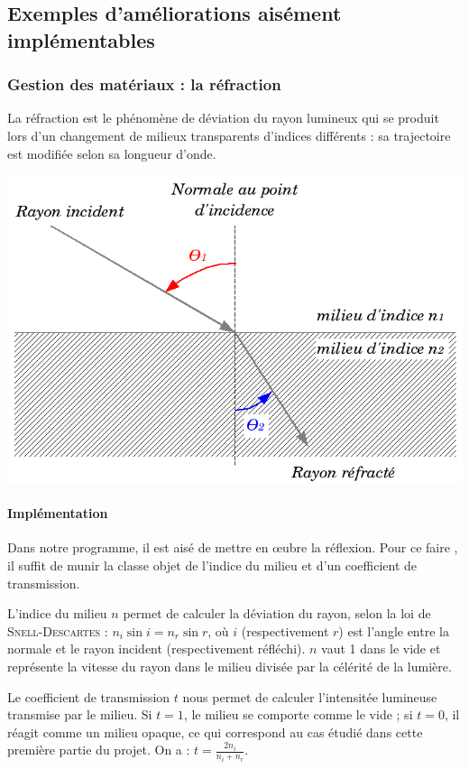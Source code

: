\documentclass{article}
\begin{document}
\subsection{Exemples d'améliorations aisément implémentables}
\subsubsection{Gestion des matériaux : la réfraction}
La réfraction est le phénomène de déviation du rayon lumineux qui se produit
lors d’un changement de milieux transparents d’indices différents : sa
trajectoire est modifiée selon sa longueur d'onde.

\begin{center}
  \includegraphics[scale=0.5]{img/refraction.png}
\end{center}

\paragraph{Implémentation}
Dans notre programme, il est aisé de mettre en œubre la réflexion. Pour ce faire
, il suffit de munir la classe objet de l'indice du milieu et d'un coefficient
de transmission.

L'indice du milieu $n$ permet de calculer la déviation du rayon, selon la loi de
\textsc{Snell-Descartes} : $n_i \sin i = n_r \sin r$, où $i$ (respectivement $r$)
est l'angle entre la normale et le rayon incident (respectivement réfléchi). $n$
vaut 1 dans le vide et représente la vitesse du rayon dans le milieu divisée par
la célérité de la lumière.

Le coefficient de transmission $t$ nous permet de calculer l'intensitée lumineuse
transmise par le milieu. Si $t=1$, le milieu se comporte comme le vide ; si $t=0$,
il réagit comme un milieu opaque, ce qui correspond au cas étudié dans cette
première partie du projet. On a : $t=\frac{2n_i}{n_i + n_r}$.
\end{document}
